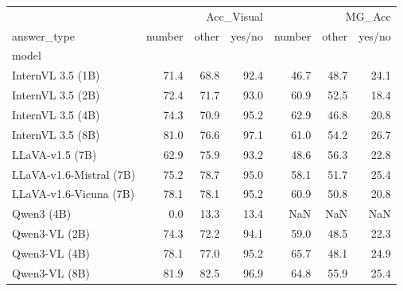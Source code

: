 \begin{tabular}{lrrrrrr}
\toprule
 & \multicolumn{3}{r}{Acc_Visual} & \multicolumn{3}{r}{MG_Acc} \\
answer_type & number & other & yes/no & number & other & yes/no \\
model &  &  &  &  &  &  \\
\midrule
InternVL 3.5 (1B) & 71.4 & 68.8 & 92.4 & 46.7 & 48.7 & 24.1 \\
InternVL 3.5 (2B) & 72.4 & 71.7 & 93.0 & 60.9 & 52.5 & 18.4 \\
InternVL 3.5 (4B) & 74.3 & 70.9 & 95.2 & 62.9 & 46.8 & 20.8 \\
InternVL 3.5 (8B) & 81.0 & 76.6 & 97.1 & 61.0 & 54.2 & 26.7 \\
LLaVA-v1.5 (7B) & 62.9 & 75.9 & 93.2 & 48.6 & 56.3 & 22.8 \\
LLaVA-v1.6-Mistral (7B) & 75.2 & 78.7 & 95.0 & 58.1 & 51.7 & 25.4 \\
LLaVA-v1.6-Vicuna (7B) & 78.1 & 78.1 & 95.2 & 60.9 & 50.8 & 20.8 \\
Qwen3 (4B) & 0.0 & 13.3 & 13.4 & NaN & NaN & NaN \\
Qwen3-VL (2B) & 74.3 & 72.2 & 94.1 & 59.0 & 48.5 & 22.3 \\
Qwen3-VL (4B) & 78.1 & 77.0 & 95.2 & 65.7 & 48.1 & 24.9 \\
Qwen3-VL (8B) & 81.9 & 82.5 & 96.9 & 64.8 & 55.9 & 25.4 \\
\bottomrule
\end{tabular}
